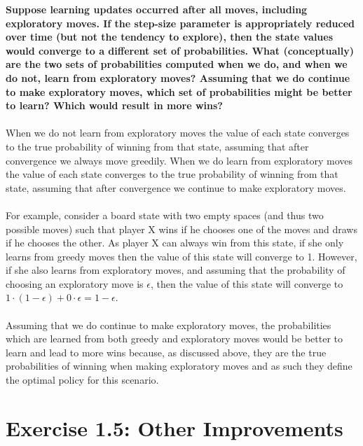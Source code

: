\documentclass[a4paper,11pt]{article}
\numberwithin{equation}{section}
\theoremstyle{remark}
\begin{document}
\textbf{Suppose learning updates occurred after all moves, including exploratory moves. If the step-size parameter is appropriately reduced over time (but not the tendency to explore), then the state values would converge to a different set of probabilities. What (conceptually) are the two sets of probabilities computed when we do, and when we do not, learn from exploratory moves? Assuming that we do continue to make exploratory moves, which set of probabilities might be better to learn? Which would result in more wins?}
\\ \\
When we do not learn from exploratory moves the value of each state converges to the true probability of winning from that state, assuming that after convergence we always move greedily. When we do learn from exploratory moves the value of each state converges to the true probability of winning from that state, assuming that after convergence we continue to make exploratory moves.
\\ \\
For example, consider a board state with two empty spaces (and thus two possible moves) such that player X wins if he chooses one of the moves and draws if he chooses the other. As player X can always win from this state, if she only learns from greedy moves then the value of this state will converge to 1. However, if she also learns from exploratory moves, and assuming that the probability of choosing an exploratory move is $\epsilon$, then the value of this state will converge to $1 \cdot (1-\epsilon) + 0 \cdot \epsilon = 1-\epsilon$.
\\ \\
Assuming that we do continue to make exploratory moves, the probabilities which are learned from both greedy and exploratory moves would be better to learn and lead to more wins because, as discussed above, they are the true probabilities of winning when making exploratory moves and as such they define the optimal policy for this scenario.

\section{Exercise 1.5: Other Improvements}
\end{document}

